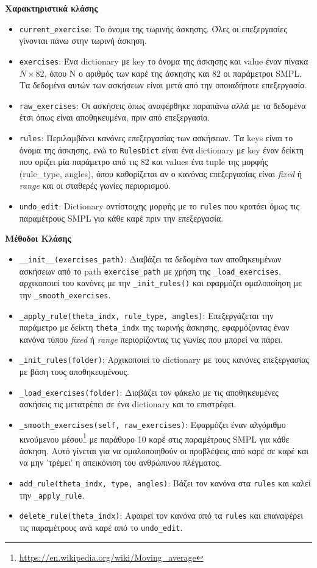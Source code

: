 \noindent\textbf{Χαρακτηριστικά κλάσης}
\begin{itemize}
	\item \texttt{current\_exercise}: Το όνομα της τωρινής άσκησης. Όλες οι επεξεργασίες γίνονται πάνω στην τωρινή άσκηση.
	\item \texttt{exercises}: Ένα dictionary με key το όνομα της άσκησης και value έναν πίνακα $Ν \times 82$, όπου N ο αριθμός των καρέ της άσκησης και 82 οι παράμετροι SMPL. Τα δεδομένα αυτών των ασκήσεων είναι μετά από την οποιαδήποτε επεξεργασία.
	\item \texttt{raw\_exercises}: Οι ασκήσεις όπως αναφέρθηκε παραπάνω αλλά με τα δεδομένα έτσι όπως είναι αποθηκευμένα, πριν από επεξεργασία.
	\item \texttt{rules}: Περιλαμβάνει κανόνες επεξεργασίας των ασκήσεων. Τα keys είναι το όνομα της άσκησης, ενώ το \texttt{RulesDict} είναι ένα dictionary με key έναν δείκτη που ορίζει μία παράμετρο από τις 82 και values ένα tuple της μορφής (rule\_type, angles), όπου καθορίζεται αν ο κανόνας επεξεργασίας είναι \textsl{fixed} ή \textsl{range} και οι σταθερές γωνίες περιορισμού.
	\item \texttt{undo\_edit}: Dictionary αντίστοιχης μορφής με το \texttt{rules} που κρατάει όμως τις παραμέτρους SMPL για κάθε καρέ πριν την επεξεργασία.
\end{itemize}

\noindent\textbf{Μέθοδοι Κλάσης}
\begin{itemize}
	\item \texttt{\_\_init\_\_(exercises\_path)}: Διαβάζει τα δεδομένα των αποθηκευμένων ασκήσεων από το path \texttt{exercise\_path} με χρήση της \texttt{\_load\_exercises}, αρχικοποιεί του κανόνες με την \texttt{\_init\_rules()} και εφαρμόζει ομαλοποίηση με την \texttt{\_smooth\_exercises}. 
	\item \texttt{\_apply\_rule(theta\_indx, rule\_type, angles)}: Επεξεργάζεται την παράμετρο με δείκτη \texttt{theta\_indx} της τωρινής άσκησης, εφαρμόζοντας έναν κανόνα τύπου \textsl{fixed} ή \textsl{range} περιορίζοντας τις γωνίες που μπορεί να πάρει.
	\item \texttt{\_init\_rules(folder)}: Αρχικοποιεί το dictionary με τους κανόνες επεξεργασίας με βάση τους αποθηκευμένους.
	\item \texttt{\_load\_exercises(folder)}: Διαβάζει τον φάκελο με τις αποθηκευμένες ασκήσεις τις μετατρέπει σε ένα dictionary και το επιστρέφει.
	\item \texttt{\_smooth\_exercises(self, raw\_exercises)}: Εφαρμόζει έναν αλγόριθμο κινούμενου μέσου\footnote{\href{https://en.wikipedia.org/wiki/Moving\_average}{https://en.wikipedia.org/wiki/Moving\_average}} με παράθυρο 10 καρέ στις παραμέτρους SMPL για κάθε άσκηση. Αυτό γίνεται για να ομαλοποιηθούν οι προβλέψεις από καρέ σε καρέ και να μην 'τρέμει' η απεικόνιση του ανθρώπινου πλέγματος.
	\item \texttt{add\_rule(theta\_indx, type, angles)}: Βάζει τον κανόνα στα \texttt{rules} και καλεί την \texttt{\_apply\_rule}.
	\item \texttt{delete\_rule(theta\_indx)}: Αφαιρεί τον κανόνα από τα \texttt{rules} και επαναφέρει τις παραμέτρους ανά καρέ από το \texttt{undo\_edit}.
\end{itemize}


